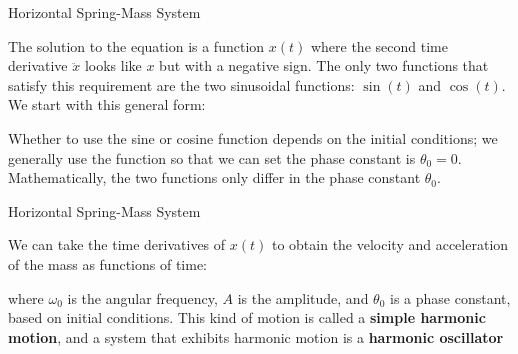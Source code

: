 \documentclass[12pt,compress,aspectratio=169]{beamer}
\begin{document}
\begin{frame}{Horizontal Spring-Mass System}


  The solution to the equation is a function $x(t)$ where the second time
  derivative $\ddot x$ looks like $x$ but with a negative sign. The only two
  functions that satisfy this requirement are the two sinusoidal functions:
  $\sin(t)$ and $\cos(t)$. We start with this general form:
    
  
  \vspace{-.15in}Whether to use the sine or cosine function depends on the
  initial conditions; we generally use the function so that we can set the
  phase constant is $\theta_0=0$. Mathematically, the two functions only differ
  in the phase constant $\theta_0$.
\end{frame}



\begin{frame}{Horizontal Spring-Mass System}

  We can take the time derivatives of $x(t)$ to obtain the velocity and
  acceleration of the mass as functions of time:
 
  \vspace{-.2in}{\large
    \begin{align*}
      x(t)&=A\cos(\omega_0 t+\theta_0)\\
      v(t)&=-A\omega_0\sin(\omega_0 t+\theta_0)\\
      a(t)&=-A\omega_0^2\cos(\omega_0 t+\theta_0)=-\omega_0^2x
    \end{align*}
  }
  
  \vspace{.05in}where $\omega_0$ is the angular frequency, $A$ is the
  amplitude, and $\theta_0$ is a phase constant, based on initial conditions.
  This kind of motion is called a \textbf{simple harmonic motion}, and a
  system that exhibits harmonic motion is a \textbf{harmonic oscillator}
\end{frame}
\end{document}
